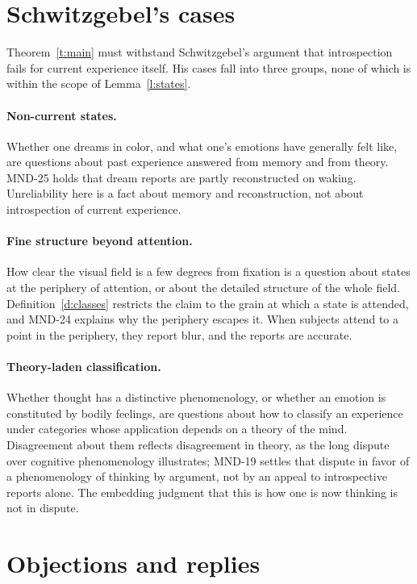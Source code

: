 \documentclass{situationist-preprint}
\begin{document}
\section{Schwitzgebel's cases}

Theorem~\ref{t:main} must withstand Schwitzgebel's argument that introspection fails for current experience itself. His cases fall into three groups, none of which is within the scope of Lemma~\ref{l:states}.

\paragraph{Non-current states.} Whether one dreams in color, and what one's emotions have generally felt like, are questions about past experience answered from memory and from theory. MND-25 holds that dream reports are partly reconstructed on waking. Unreliability here is a fact about memory and reconstruction, not about introspection of current experience.

\paragraph{Fine structure beyond attention.} How clear the visual field is a few degrees from fixation is a question about states at the periphery of attention, or about the detailed structure of the whole field. Definition~\ref{d:classes} restricts the claim to the grain at which a state is attended, and MND-24 explains why the periphery escapes it. When subjects attend to a point in the periphery, they report blur, and the reports are accurate.

\paragraph{Theory-laden classification.} Whether thought has a distinctive phenomenology, or whether an emotion is constituted by bodily feelings, are questions about how to classify an experience under categories whose application depends on a theory of the mind. Disagreement about them reflects disagreement in theory, as the long dispute over cognitive phenomenology illustrates; MND-19 settles that dispute in favor of a phenomenology of thinking by argument, not by an appeal to introspective reports alone. The embedding judgment that this is how one is now thinking is not in dispute.

\section{Objections and replies}
\end{document}
